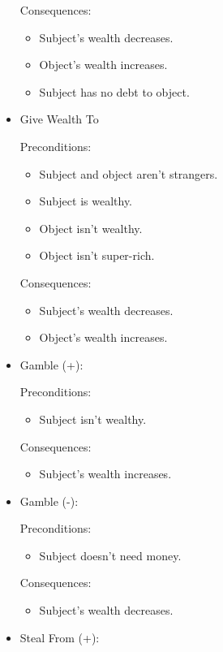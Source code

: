 \documentclass[12pt]{article}
\begin{document}
\begin{itemize}
    Consequences:
    \begin{itemize}
      \item Subject's wealth decreases.
      \item Object's wealth increases.
      \item Subject has no debt to object.
    \end{itemize}

  \item Give Wealth To

    Preconditions:
    \begin{itemize}
      \item Subject and object aren't strangers.
      \item Subject is wealthy.
      \item Object isn't wealthy.
      \item Object isn't super-rich.
    \end{itemize}

    Consequences:
    \begin{itemize}
      \item Subject's wealth decreases.
      \item Object's wealth increases.
    \end{itemize}

  \item Gamble (+):

    Preconditions:
    \begin{itemize}
      \item Subject isn't wealthy.
    \end{itemize}

    Consequences:
    \begin{itemize}
      \item Subject's wealth increases.
    \end{itemize}

  \item Gamble (-):

    Preconditions:
    \begin{itemize}
      \item Subject doesn't need money.
    \end{itemize}

    Consequences:
    \begin{itemize}
      \item Subject's wealth decreases.
    \end{itemize}

  \item Steal From (+):


\end{itemize}
\end{document}
